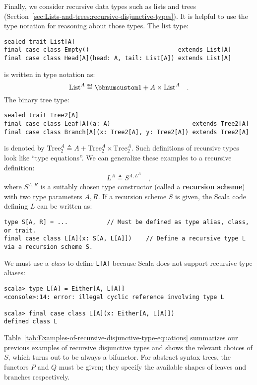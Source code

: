 Finally, we consider recursive data types such as lists and trees
(Section~\ref{sec:Lists-and-trees:recursive-disjunctive-types}).
It is helpful to use the type notation for reasoning about those types.
The list type:
\begin{lstlisting}
sealed trait List[A]
final case class Empty()                         extends List[A]
final case class Head[A](head: A, tail: List[A]) extends List[A]
\end{lstlisting}
is written in type notation as:
\[
\text{List}^{A}\triangleq\bbnum 1+A\times\text{List}^{A}\quad.
\]
The binary tree type:
\begin{lstlisting}
sealed trait Tree2[A]
final case class Leaf[A](a: A)                       extends Tree2[A]
final case class Branch[A](x: Tree2[A], y: Tree2[A]) extends Tree2[A]
\end{lstlisting}
is denoted by $\text{Tree}_{2}^{A}\triangleq A+\text{Tree}_{2}^{A}\times\text{Tree}_{2}^{A}$.
Such definitions of recursive types look like \textsf{``}type equations\textsf{''}.
We can generalize these examples to a recursive definition:
\begin{equation}
L^{A}\triangleq S^{A,L^{A}}\quad,\label{eq:f-def-recursive-functor}
\end{equation}
where $S^{A,R}$ is a suitably chosen type constructor (called a \textbf{recursion
scheme}) with two type parameters $A,R$. If a recursion scheme $S$
is given, the Scala code defining $L$ can be written as:
\begin{lstlisting}
type S[A, R] = ...           // Must be defined as type alias, class, or trait.
final case class L[A](x: S[A, L[A]])    // Define a recursive type L via a recursion scheme S.
\end{lstlisting}
We must use a \emph{class} to define \lstinline!L[A]! because Scala
does not support recursive type aliases:
\begin{lstlisting}
scala> type L[A] = Either[A, L[A]]
<console>:14: error: illegal cyclic reference involving type L

scala> final case class L[A](x: Either[A, L[A]])
defined class L
\end{lstlisting}

Table~\ref{tab:Examples-of-recursive-disjunctive-type-equations}
summarizes our previous examples of recursive disjunctive types and
shows the relevant choices of $S$, which turns out to be always a
bifunctor. For abstract syntax trees, the functors $P$ and $Q$ must
be given; they specify the available shapes of leaves and branches
respectively. 


